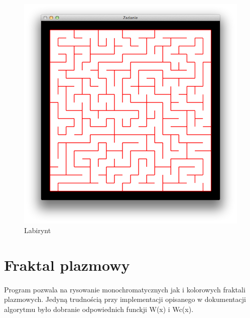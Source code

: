 \documentclass[wide,a4paper,titlepage,12pt] {article}
\begin{document}
  \paragraph{}

  

  \begin{figure}[htbp]
    \begin{center}
      \includegraphics[scale=0.6]{maze.png}
      \caption{Labirynt}
    \end{center}
  \end{figure}

  \newpage

  \section{Fraktal plazmowy}
  \paragraph{}
  Program pozwala na rysowanie monochromatycznych jak i kolorowych fraktali plazmowych.
  Jedyną trudnością przy implementacji opisanego w dokumentacji algorytmu było dobranie
  odpowiednich funckji W(x) i Wc(x).

  \paragraph{}
\end{document}
